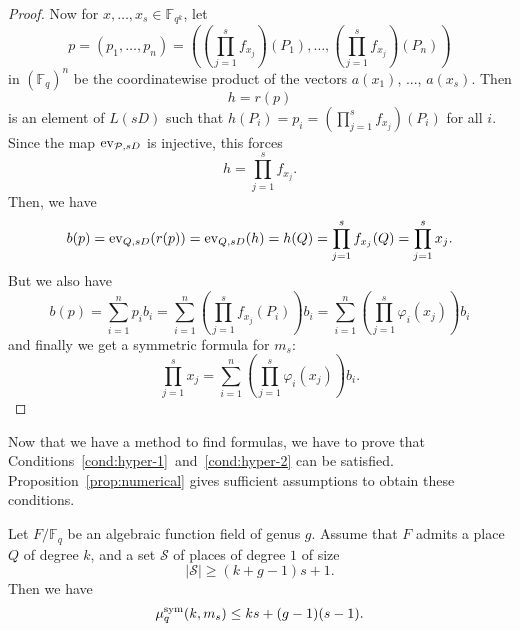 \begin{proof}
Now for $x,\dots,x_s\in\mathbb{F}_{q^k}$, let
  \[
    p = (p_1,\dots,p_n) = ((\prod_{j=1}^sf_{x_j})(P_1), \dots, (\prod_{j=1}^sf_{x_j})(P_n))
  \]
in $(\mathbb{F}_{q})^n$  be the coordinatewise product of the vectors $a(x_1)$, ..., $a(x_s)$.
Then
\[
  h = r(p)
\]
is an element of $L(sD)$ such that $h(P_i) = p_i = (\prod_{j=1}^sf_{x_j})(P_i)$ for all $i$.
Since the map $\operatorname{ev}_{\mathcal{P}, sD}$ is injective, this forces
\[
  h = \prod_{j=1}^sf_{x_j}.
\]
Then, we have
\begin{equation*}
b(p) = \operatorname{ev}_{Q, sD}(r(p))
  = \operatorname{ev}_{Q, sD}(h)
  = h(Q)
  = \prod_{j=1}^s f_{x_j}(Q)
  = \prod_{j=1}^s x_j.
\end{equation*}
But we also have
\[
  b(p) = \sum_{i=1}^np_ib_i=\sum_{i=1}^n(\prod_{j=1}^sf_{x_j}(P_i))b_i=\sum_{i=1}^n(\prod_{j=1}^s\varphi_i(x_j))b_i
\]
and finally we get a symmetric formula for $m_s$:
\[
  \prod_{j=1}^s x_j = \sum_{i=1}^n(\prod_{j=1}^s\varphi_i(x_j))b_i.
\]
\end{proof}
Now that we have a method to find formulas, we have to prove that
Conditions~\ref{cond:hyper-1}~and~\ref{cond:hyper-2} can be satisfied.
Proposition~\ref{prop:numerical} gives sufficient assumptions to obtain these
conditions.
\begin{prop}
\label{prop:numerical}
Let $F/\mathbb{F}_{q}$ be an algebraic function field of genus $g$.
Assume that $F$ admits a place $Q$ of degree $k$, and a set $\mathcal{S}$ of
places of degree $1$ of size 
\[
  |\mathcal{S}|\geq (k+g-1)s+1.
\]
Then we have
\[ \mu^{\textrm{sym}}_q(k,m_s)\leq ks+(g-1)(s-1). \]
\end{prop}
